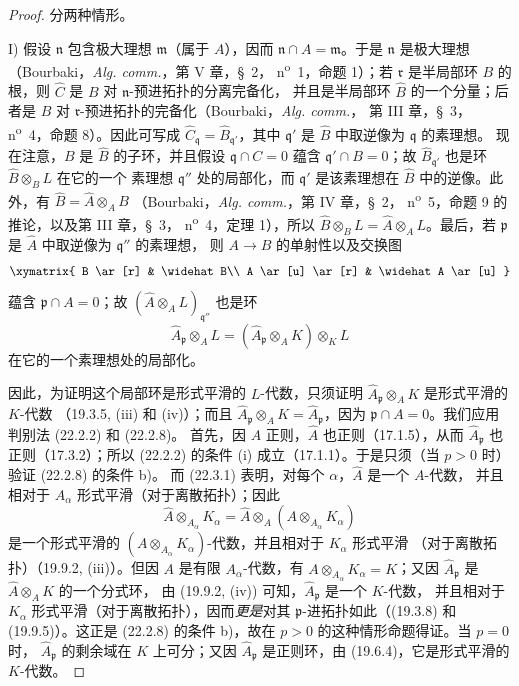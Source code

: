 \begin{proof}
分两种情形。

I) 假设 $\mathfrak n$ 包含极大理想 $\mathfrak m$（属于 $A$），因而
$\mathfrak n\cap A=\mathfrak m$。于是 $\mathfrak n$ 是极大理想
（Bourbaki，\emph{Alg. comm.}，第 V 章，§~2，
n\textsuperscript{o}~1，命题 1）；若 $\mathfrak r$ 是半局部环 $B$ 的
根，则 $\widehat C$ 是 $B$ 对 $\mathfrak n$-预进拓扑的分离完备化，
并且是半局部环 $\widehat B$ 的一个分量；后者是 $B$ 对
$\mathfrak r$-预进拓扑的完备化（Bourbaki，\emph{Alg. comm.}，
第 III 章，§~3，n\textsuperscript{o}~4，命题 8）。因此可写成
$\widehat C_\mathfrak q=\widehat B_{\mathfrak q'}$，其中
$\mathfrak q'$ 是 $\widehat B$ 中取逆像为 $\mathfrak q$ 的素理想。
现在注意，$B$ 是 $\widehat B$ 的子环，并且假设
$\mathfrak q\cap C=0$ 蕴含 $\mathfrak q'\cap B=0$；故
$\widehat B_{\mathfrak q'}$ 也是环 $\widehat B\otimes_B L$ 在它的一个
素理想 $\mathfrak q''$ 处的局部化，而 $\mathfrak q'$ 是该素理想在
$\widehat B$ 中的逆像。此外，有
$\widehat B=\widehat A\otimes_A B$
（Bourbaki，\emph{Alg. comm.}，第 IV 章，§~2，
n\textsuperscript{o}~5，命题 9 的推论，以及第 III 章，§~3，
n\textsuperscript{o}~4，定理 1），所以
$\widehat B\otimes_B L=\widehat A\otimes_A L$。最后，若
$\mathfrak p$ 是 $\widehat A$ 中取逆像为 $\mathfrak q''$ 的素理想，
则 $A\to B$ 的单射性以及交换图
\[
  \xymatrix{
    B \ar[r] & \widehat B\\
    A \ar[u] \ar[r] & \widehat A \ar[u]
  }
\]
蕴含 $\mathfrak p\cap A=0$；故
$(\widehat A\otimes_A L)_{\mathfrak q''}$ 也是环
\[
  \widehat A_\mathfrak p\otimes_A L
  =(\widehat A_\mathfrak p\otimes_A K)\otimes_K L
\]
在它的一个素理想处的局部化。


因此，为证明这个局部环是形式平滑的 $L$-代数，只须证明
$\widehat A_\mathfrak p\otimes_A K$ 是形式平滑的 $K$-代数
（19.3.5, (iii) 和 (iv)）；而且
$\widehat A_\mathfrak p\otimes_A K=\widehat A_\mathfrak p$，因为
$\mathfrak p\cap A=0$。我们应用判别法 (22.2.2) 和 (22.2.8)。
首先，因 $A$ 正则，$\widehat A$ 也正则（17.1.5），从而
$\widehat A_\mathfrak p$ 也正则（17.3.2）；所以 (22.2.2) 的条件 (i)
成立（17.1.1）。于是只须（当 $p>0$ 时）验证 (22.2.8) 的条件 b)。
而 (22.3.1) 表明，对每个 $\alpha$，$\widehat A$ 是一个 $A$-代数，
并且相对于 $A_\alpha$ 形式平滑（对于离散拓扑）；因此
\[
  \widehat A\otimes_{A_\alpha}K_\alpha
  =\widehat A\otimes_A(A\otimes_{A_\alpha}K_\alpha)
\]
是一个形式平滑的
$(A\otimes_{A_\alpha}K_\alpha)$-代数，并且相对于 $K_\alpha$ 形式平滑
（对于离散拓扑）（19.9.2, (iii)）。但因 $A$ 是有限
$A_\alpha$-代数，有 $A\otimes_{A_\alpha}K_\alpha=K$；又因
$\widehat A_\mathfrak p$ 是 $\widehat A\otimes_A K$ 的一个分式环，
由 (19.9.2, (iv)) 可知，$\widehat A_\mathfrak p$ 是一个 $K$-代数，
并且相对于 $K_\alpha$ 形式平滑（对于离散拓扑），因而\emph{更是}对其
$\mathfrak p$-进拓扑如此（(19.3.8) 和 (19.9.5)）。这正是 (22.2.8)
的条件 b)，故在 $p>0$ 的这种情形命题得证。当 $p=0$ 时，
$\widehat A_\mathfrak p$ 的剩余域在 $K$ 上可分；又因
$\widehat A_\mathfrak p$ 是正则环，由 (19.6.4)，它是形式平滑的
$K$-代数。


\end{proof}
